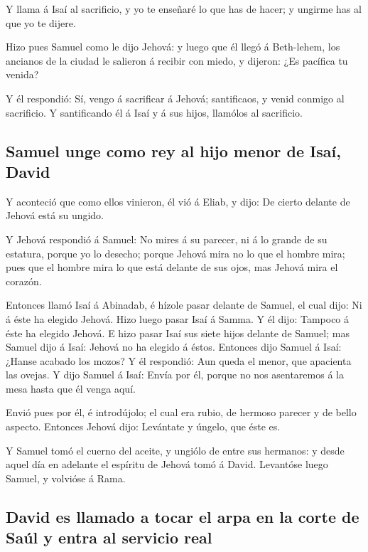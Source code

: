  Y llama á Isaí al sacrificio, y yo te enseñaré lo que has
de hacer; y ungirme has al que yo te dijere.

 Hizo pues Samuel como le dijo Jehová: y luego que él
llegó á Beth-lehem, los ancianos de la ciudad le salieron á recibir con
miedo, y dijeron: ¿Es pacífica tu venida?

 Y él respondió: Sí, vengo á sacrificar á Jehová;
santificaos, y venid conmigo al sacrificio. Y santificando él á Isaí y á
sus hijos, llamólos al sacrificio.

\hypertarget{samuel-unge-como-rey-al-hijo-menor-de-isauxed-david}{%
\subsection{Samuel unge como rey al hijo menor de Isaí,
David}\label{samuel-unge-como-rey-al-hijo-menor-de-isauxed-david}}

 Y aconteció que como ellos vinieron, él vió á Eliab, y
dijo: De cierto delante de Jehová está su ungido.

 Y Jehová respondió á Samuel: No mires á su parecer, ni á
lo grande de su estatura, porque yo lo desecho; porque Jehová mira no lo
que el hombre mira; pues que el hombre mira lo que está delante de sus
ojos, mas Jehová mira el corazón.

 Entonces llamó Isaí á Abinadab, é hízole pasar delante de
Samuel, el cual dijo: Ni á éste ha elegido Jehová.  Hizo
luego pasar Isaí á Samma. Y él dijo: Tampoco á éste ha elegido Jehová.
 E hizo pasar Isaí sus siete hijos delante de Samuel; mas
Samuel dijo á Isaí: Jehová no ha elegido á éstos. 
Entonces dijo Samuel á Isaí: ¿Hanse acabado los mozos? Y él respondió:
Aun queda el menor, que apacienta las ovejas. Y dijo Samuel á Isaí:
Envía por él, porque no nos asentaremos á la mesa hasta que él venga
aquí.

 Envió pues por él, é introdújolo; el cual era rubio, de
hermoso parecer y de bello aspecto. Entonces Jehová dijo: Levántate y
úngelo, que éste es.

 Y Samuel tomó el cuerno del aceite, y ungiólo de entre
sus hermanos: y desde aquel día en adelante el espíritu de Jehová tomó á
David. Levantóse luego Samuel, y volvióse á Rama.

\hypertarget{david-es-llamado-a-tocar-el-arpa-en-la-corte-de-sauxfal-y-entra-al-servicio-real}{%
\subsection{David es llamado a tocar el arpa en la corte de Saúl y entra
al servicio
real}\label{david-es-llamado-a-tocar-el-arpa-en-la-corte-de-sauxfal-y-entra-al-servicio-real}}

